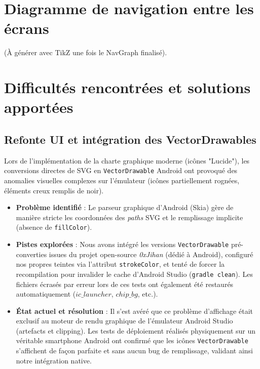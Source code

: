 \documentclass{article}
\begin{document}
\section{Diagramme de navigation entre les écrans}
(À générer avec TikZ une fois le NavGraph finalisé).

\section{Difficultés rencontrées et solutions apportées}

\subsection{Refonte UI et intégration des VectorDrawables}
Lors de l'implémentation de la charte graphique moderne (icônes "Lucide"), les conversions directes de SVG en \texttt{VectorDrawable} Android ont provoqué des anomalies visuelles complexes sur l'émulateur (icônes partiellement rognées, éléments creux remplis de noir).
\begin{itemize}
    \item \textbf{Problème identifié} : Le parseur graphique d'Android (Skia) gère de manière stricte les coordonnées des \textit{paths} SVG et le remplissage implicite (absence de \texttt{fillColor}).
    \item \textbf{Pistes explorées} : Nous avons intégré les versions \texttt{VectorDrawable} pré-converties issues du projet open-source \textit{0xJihan} (dédié à Android), configuré nos propres teintes via l'attribut \texttt{strokeColor}, et tenté de forcer la recompilation pour invalider le cache d'Android Studio (\texttt{gradle clean}). Les fichiers écrasés par erreur lors de ces tests ont également été restaurés automatiquement ($ic\_launcher$, $chip\_bg$, etc.).
    \item \textbf{État actuel et résolution} : Il s'est avéré que ce problème d'affichage était exclusif au moteur de rendu graphique de l'émulateur Android Studio (artefacts et clipping). Les tests de déploiement réalisés physiquement sur un véritable smartphone Android ont confirmé que les icônes \texttt{VectorDrawable} s'affichent de façon parfaite et sans aucun bug de remplissage, validant ainsi notre intégration native.
\end{itemize}
\end{document}

